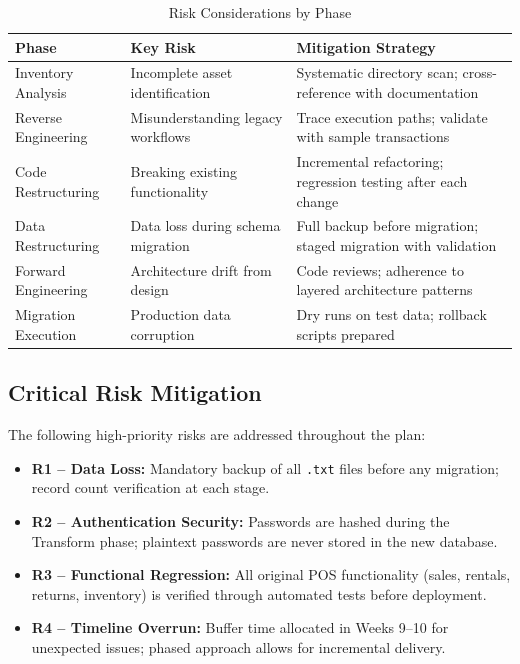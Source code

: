 \begin{table}[h]
  \centering
  \caption{Risk Considerations by Phase}
  \label{tab:phase-risks}
  \begin{tabular}{p{3.5cm} p{4.5cm} p{5cm}}
    \toprule
    \textbf{Phase} & \textbf{Key Risk} & \textbf{Mitigation Strategy} \\
    \midrule
    Inventory Analysis &
      Incomplete asset identification &
      Systematic directory scan; cross-reference with documentation \\
    Reverse Engineering &
      Misunderstanding legacy workflows &
      Trace execution paths; validate with sample transactions \\
    Code Restructuring &
      Breaking existing functionality &
      Incremental refactoring; regression testing after each change \\
    Data Restructuring &
      Data loss during schema migration &
      Full backup before migration; staged migration with validation \\
    Forward Engineering &
      Architecture drift from design &
      Code reviews; adherence to layered architecture patterns \\
    Migration Execution &
      Production data corruption &
      Dry runs on test data; rollback scripts prepared \\
    \bottomrule
  \end{tabular}
\end{table}

\subsection{Critical Risk Mitigation}

The following high-priority risks are addressed throughout the plan:

\begin{itemize}
  \item \textbf{R1 -- Data Loss:} Mandatory backup of all \texttt{.txt} files before
        any migration; record count verification at each stage.
  \item \textbf{R2 -- Authentication Security:} Passwords are hashed during the
        Transform phase; plaintext passwords are never stored in the new database.
  \item \textbf{R3 -- Functional Regression:} All original POS functionality
        (sales, rentals, returns, inventory) is verified through automated tests
        before deployment.
  \item \textbf{R4 -- Timeline Overrun:} Buffer time allocated in Weeks 9--10 for
        unexpected issues; phased approach allows for incremental delivery.
\end{itemize}

